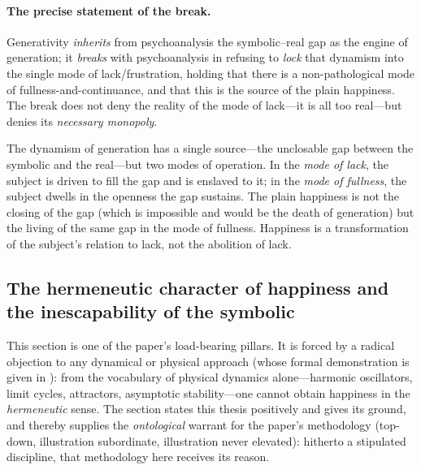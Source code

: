 \paragraph{The precise statement of the break.} Generativity \emph{inherits} from psychoanalysis the symbolic--real gap as the engine of generation; it \emph{breaks} with psychoanalysis in refusing to \emph{lock} that dynamism into the single mode of lack/frustration, holding that there is a non-pathological mode of fullness-and-continuance, and that this is the source of the plain happiness. The break does not deny the reality of the mode of lack---it is all too real---but denies its \emph{necessary monopoly}.

\begin{claim}
The dynamism of generation has a single source---the unclosable gap between the symbolic and the real---but two modes of operation. In the \emph{mode of lack}, the subject is driven to fill the gap and is enslaved to it; in the \emph{mode of fullness}, the subject dwells in the openness the gap sustains. The plain happiness is not the closing of the gap (which is impossible and would be the death of generation) but the living of the same gap in the mode of fullness. Happiness is a transformation of the subject's relation to lack, not the abolition of lack.
\end{claim}

\subsection{The hermeneutic character of happiness and the inescapability of the symbolic}
\label{p19:sub:gen-hermeneutic}

This section is one of the paper's load-bearing pillars. It is forced by a radical objection to any dynamical or physical approach (whose formal demonstration is given in ): from the vocabulary of physical dynamics alone---harmonic oscillators, limit cycles, attractors, asymptotic stability---one cannot obtain happiness in the \emph{hermeneutic} sense. The section states this thesis positively and gives its ground, and thereby supplies the \emph{ontological} warrant for the paper's methodology (top-down, illustration subordinate, illustration never elevated): hitherto a stipulated discipline, that methodology here receives its reason.

